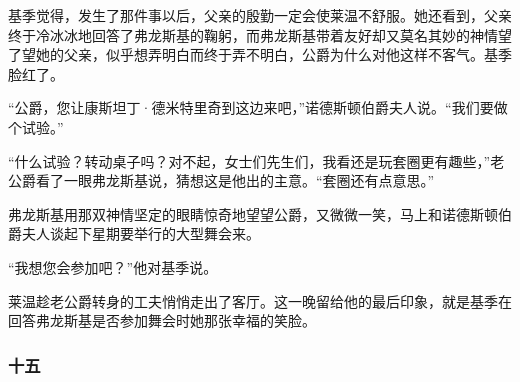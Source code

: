 \par 基季觉得，发生了那件事以后，父亲的殷勤一定会使莱温不舒服。她还看到，父亲终于冷冰冰地回答了弗龙斯基的鞠躬，而弗龙斯基带着友好却又莫名其妙的神情望了望她的父亲，似乎想弄明白而终于弄不明白，公爵为什么对他这样不客气。基季脸红了。
\par “公爵，您让康斯坦丁·德米特里奇到这边来吧，”诺德斯顿伯爵夫人说。“我们要做个试验。”
\par “什么试验？转动桌子吗？对不起，女士们先生们，我看还是玩套圈更有趣些，”老公爵看了一眼弗龙斯基说，猜想这是他出的主意。“套圈还有点意思。”
\par 弗龙斯基用那双神情坚定的眼睛惊奇地望望公爵，又微微一笑，马上和诺德斯顿伯爵夫人谈起下星期要举行的大型舞会来。
\par “我想您会参加吧？”他对基季说。
\par 莱温趁老公爵转身的工夫悄悄走出了客厅。这一晚留给他的最后印象，就是基季在回答弗龙斯基是否参加舞会时她那张幸福的笑脸。


\subsubsection*{十五}

